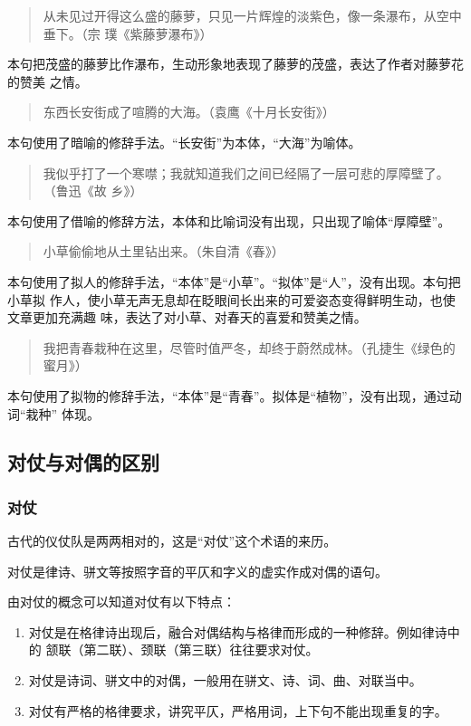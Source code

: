 \documentclass[final,oneside]{ctexbook}
\newenvironment{equotation}{\begin{quotation}\kaishu}{\end{quotation}}
\begin{document}
\begin{equotation}
  从未见过开得这么盛的藤萝，只见一片辉煌的淡紫色，像一条瀑布，从空中垂下。（宗
  璞《紫藤萝瀑布》）
\end{equotation}
本句把茂盛的藤萝比作瀑布，生动形象地表现了藤萝的茂盛，表达了作者对藤萝花的赞美
之情。

\begin{equotation}
  东西长安街成了喧腾的大海。（袁鹰《十月长安街》）
\end{equotation}
本句使用了暗喻的修辞手法。“长安街”为本体，“大海”为喻体。

\begin{equotation}
  我似乎打了一个寒噤；我就知道我们之间已经隔了一层可悲的厚障壁了。（鲁迅《故
  乡》）
\end{equotation}
本句使用了借喻的修辞方法，本体和比喻词没有出现，只出现了喻体“厚障壁”。

\begin{equotation}
  小草偷偷地从土里钻出来。（朱自清《春》）
\end{equotation}
本句使用了拟人的修辞手法，“本体”是“小草”。“拟体”是“人”，没有出现。本句把小草拟
作人，使小草无声无息却在眨眼间长出来的可爱姿态变得鲜明生动，也使文章更加充满趣
味，表达了对小草、对春天的喜爱和赞美之情。

\begin{equotation}
  我把青春栽种在这里，尽管时值严冬，却终于蔚然成林。（孔捷生《绿色的蜜月》）
\end{equotation}
本句使用了拟物的修辞手法，“本体”是“青春”。拟体是“植物”，没有出现，通过动词“栽种”
体现。

\subsection{对仗与对偶的区别}

\subsubsection{对仗}

古代的仪仗队是两两相对的，这是“对仗”这个术语的来历。

对仗是律诗、骈文等按照字音的平仄和字义的虚实作成对偶的语句。

由对仗的概念可以知道对仗有以下特点：

\begin{enumerate}
  \item 对仗是在格律诗出现后，融合对偶结构与格律而形成的一种修辞。例如律诗中的
    颔联（第二联）、颈联（第三联）往往要求对仗。

  \item 对仗是诗词、骈文中的对偶，一般用在骈文、诗、词、曲、对联当中。

  \item 对仗有严格的格律要求，讲究平仄，严格用词，上下句不能出现重复的字。
\end{enumerate}
\end{document}
